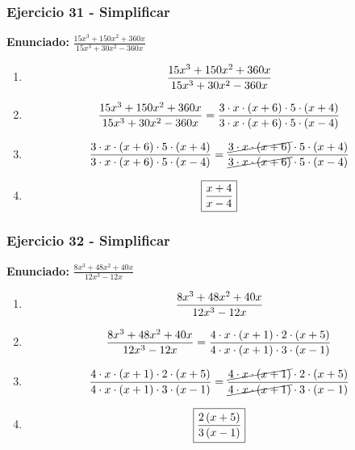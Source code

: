 \documentclass[11pt,a4paper]{article}
\newcommand{\fitmath}[1]{%
\[
\setbox0=\hbox{$\displaystyle #1$}%
\ifdim\wd0>\linewidth
\resizebox{\linewidth}{!}{$\displaystyle #1$}%
\else
#1%
\fi
\]
}
\begin{document}
\vspace{0.12cm}
\subsubsection*{Ejercicio 31 - Simplificar}
\textbf{Enunciado:} $ \frac{15 x^{3} + 150 x^{2} + 360 x}{15 x^{3} + 30 x^{2} - 360 x} $\par
\begin{enumerate}[leftmargin=2em]
\item \fitmath{\frac{15 x^{3} + 150 x^{2} + 360 x}{15 x^{3} + 30 x^{2} - 360 x}}
\item \fitmath{\frac{15 x^{3} + 150 x^{2} + 360 x}{15 x^{3} + 30 x^{2} - 360 x}=\frac{3\cdot x\cdot \left(x + 6\right)\cdot 5\cdot \left(x + 4\right)}{3\cdot x\cdot \left(x + 6\right)\cdot 5\cdot \left(x - 4\right)}}
\item \fitmath{\frac{3\cdot x\cdot \left(x + 6\right)\cdot 5\cdot \left(x + 4\right)}{3\cdot x\cdot \left(x + 6\right)\cdot 5\cdot \left(x - 4\right)}=\frac{\cancel{3\cdot x\cdot \left(x + 6\right)}\cdot 5\cdot \left(x + 4\right)}{\cancel{3\cdot x\cdot \left(x + 6\right)}\cdot 5\cdot \left(x - 4\right)}}
\item \fitmath{\boxed{\frac{x + 4}{x - 4}}}
\end{enumerate}

\vspace{0.12cm}
\subsubsection*{Ejercicio 32 - Simplificar}
\textbf{Enunciado:} $ \frac{8 x^{3} + 48 x^{2} + 40 x}{12 x^{3} - 12 x} $\par
\begin{enumerate}[leftmargin=2em]
\item \fitmath{\frac{8 x^{3} + 48 x^{2} + 40 x}{12 x^{3} - 12 x}}
\item \fitmath{\frac{8 x^{3} + 48 x^{2} + 40 x}{12 x^{3} - 12 x}=\frac{4\cdot x\cdot \left(x + 1\right)\cdot 2\cdot \left(x + 5\right)}{4\cdot x\cdot \left(x + 1\right)\cdot 3\cdot \left(x - 1\right)}}
\item \fitmath{\frac{4\cdot x\cdot \left(x + 1\right)\cdot 2\cdot \left(x + 5\right)}{4\cdot x\cdot \left(x + 1\right)\cdot 3\cdot \left(x - 1\right)}=\frac{\cancel{4\cdot x\cdot \left(x + 1\right)}\cdot 2\cdot \left(x + 5\right)}{\cancel{4\cdot x\cdot \left(x + 1\right)}\cdot 3\cdot \left(x - 1\right)}}
\item \fitmath{\boxed{\frac{2 \left(x + 5\right)}{3 \left(x - 1\right)}}}
\end{enumerate}
\end{document}
